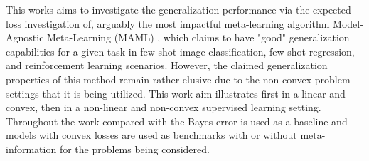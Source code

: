 This works aims to investigate the generalization performance via the expected loss investigation of, arguably the most impactful meta-learning algorithm Model-Agnostic Meta-Learning (MAML) \cite{Finn2017}, which claims to have "good" generalization capabilities for a given task in few-shot image classification, few-shot regression, and reinforcement learning scenarios. However, the claimed generalization properties of this method remain rather elusive due to the non-convex problem settings that it is being utilized. This work aim illustrates first in a linear and convex, then in a non-linear and non-convex supervised learning setting.  Throughout the work compared with the Bayes error is used as a baseline and models with convex losses are used as benchmarks with or without meta-information for the problems being considered. %
